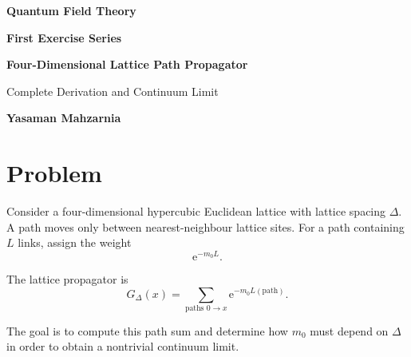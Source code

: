 \documentclass[11pt,a4paper,oneside]{article}
\newcommand{\ee}{\mathrm{e}}
\begin{document}
	
	
	\begin{center}
		
		{\Large\textbf{Quantum Field Theory}}
		
		\vspace{0.4cm}
		
		{\Large\textbf{First Exercise Series}}
		
		\vspace{0.7cm}
		
		{\large\textbf{Four-Dimensional Lattice Path Propagator}}
		
		\vspace{0.25cm}
		
		{\large Complete Derivation and Continuum Limit}
		
		\vspace{0.7cm}
		
		{\large\textbf{Yasaman Mahzarnia}}
		
	\end{center}
	
	\vspace{0.8cm}
	
	
	\section*{Problem}
	
	Consider a four-dimensional hypercubic Euclidean lattice with lattice spacing
	$\Delta$. A path moves only between nearest-neighbour lattice sites. For a path
	containing $L$ links, assign the weight
	\[
	\ee^{-m_0 L}.
	\]
	
	The lattice propagator is
	\begin{equation}
		G_\Delta(x)
		=
		\sum_{\text{paths }0\to x}
		\ee^{-m_0 L(\text{path})}.
		\label{eq:definition}
	\end{equation}
	
	The goal is to compute this path sum and determine how $m_0$ must depend on
	$\Delta$ in order to obtain a nontrivial continuum limit.
	
	
\end{document}
